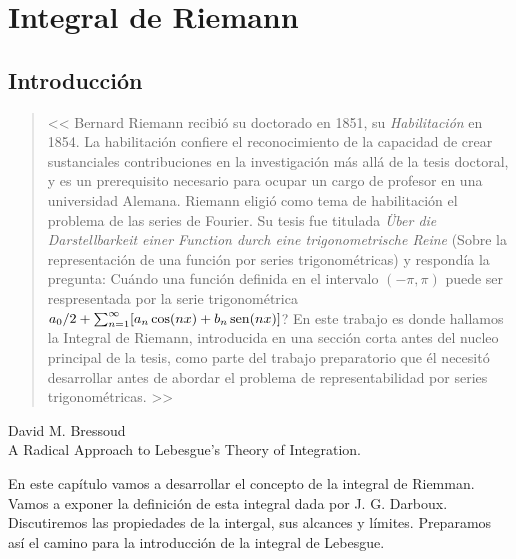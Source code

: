\chapter{Integral de Riemann}

\section{Introducción}

\begin{quotation}
<< Bernard Riemann recibió su doctorado en 1851, su \emph{Habilitación} en 1854. La habilitación confiere el reconocimiento de la capacidad de crear sustanciales contribuciones en la investigación más allá de la tesis doctoral, y es un prerequisito necesario para ocupar un cargo de profesor en una universidad Alemana. Riemann eligió como tema  de habilitación el problema de las series de Fourier. Su tesis fue titulada \emph{\"Uber die Darstellbarkeit einer Function durch eine trigonometrische Reine} (Sobre la representación de una función por series trigonométricas) y respondía la pregunta:  Cuándo una función definida en el intervalo $(-\pi,\pi)$ puede ser respresentada por la serie trigonométrica $a_0/2+\sum_{n=1}^{\infty}[a_n\cos(nx)+b_n\operatorname{sen}(nx)]$? 
En este trabajo  es donde hallamos   la Integral de Riemann, introducida en una sección corta antes del nucleo principal de la tesis, como parte del trabajo preparatorio que él necesitó desarrollar antes de abordar el problema de representabilidad por series trigonométricas. >> 
\end{quotation}
\begin{flushright}
 David M. Bressoud\\
 A Radical Approach to Lebesgue's Theory of Integration.
\end{flushright}


En este capítulo vamos a desarrollar el concepto de la integral de Riemman. Vamos a exponer la definición de esta integral dada por J. G. Darboux. Discutiremos las propiedades de la intergal, sus alcances y límites. Preparamos así el camino para la introducción de la integral de Lebesgue. 

